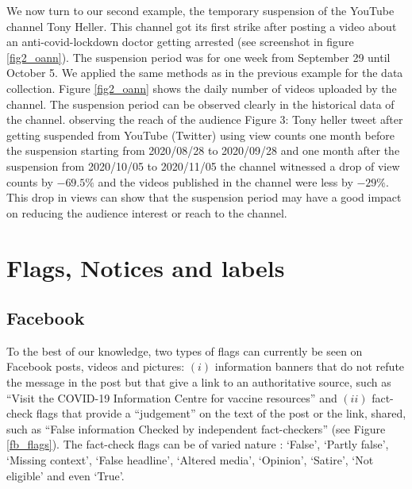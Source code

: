 \documentclass{article}
\begin{document}
We now turn to our second example, the temporary suspension of the YouTube channel Tony Heller. This channel got its first strike after posting a video about an anti-covid-lockdown doctor getting arrested (see screenshot in figure \ref{fig2_oann}). The suspension period was for one week from September 29 until October 5. We applied the same methods as in the previous example for the data collection. Figure \ref{fig2_oann} shows the daily number of videos uploaded by the channel. The suspension period can be observed clearly in the historical data of the channel.  observing the reach of the audience 
Figure 3: Tony heller tweet after getting suspended from YouTube (Twitter)
using view counts one month before the suspension starting from 2020/08/28 to 2020/09/28 and one month after the suspension from 2020/10/05 to 2020/11/05 the channel witnessed a drop of view counts by $-69.5\%$ and the videos published in the channel were less by $-29\%$. This drop in views can show that the  suspension  period
may  have  a  good  impact  on  reducing  the  audience interest or reach to the channel.


\section{Flags, Notices and labels}

\subsection{Facebook}

To the best of our knowledge, two types of flags can currently be seen on Facebook posts, videos and pictures: $(i)$ information banners that do not refute the message in the post but that give a link to an authoritative source, such as ``Visit the COVID-19 Information Centre for vaccine resources'' and $(ii)$ fact-check flags that provide a ``judgement'' on the text of the post or the link, shared, such as ``False information Checked by independent fact-checkers'' (see Figure \ref{fb_flags}). The fact-check flags can be of varied nature : `False', `Partly false', `Missing context', `False headline', `Altered media', `Opinion', `Satire', `Not eligible' and even `True'.
\end{document}

